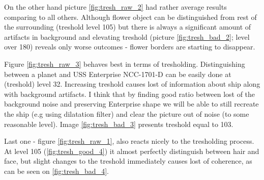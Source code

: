 \documentclass{article}
\begin{document}
On the other hand picture \ref{fig:tresh_raw_2} had rather average results comparing to all others. Although flower object can be distinguished from rest of the surrounding (treshold level 105) but there is always a significant amount of artifacts in background and elevating treshold (picture \ref{fig:tresh_bad_2}; level over 180) reveals only worse outcomes - flower borders are starting to disappear.

Figure \ref{fig:tresh_raw_3} behaves best in terms of tresholding. Distinguishing between a planet and USS Enterprise NCC-1701-D can be easily done at (treshold) level 32. Increasing treshold causes lost of information about ship along with background artifacts. I think that by finding good ratio between lost of the background noise and preserving Enterprise shape we will be able to still recreate the ship (e.g using dilatation filter) and clear the picture out of noise (to some reasonable level). Image \ref{fig:tresh_bad_3} presents treshold equal to 103.

Last one - figure \ref{fig:tresh_raw_1}, also reacts nicely to the tresholding process. At level 105 (\ref{fig:tresh_good_4}) it almost perfectly distinguish between hair and face, but slight changes to the treshold immediately causes lost of coherence, as can be seen on \ref{fig:tresh_bad_4}.
\end{document}
